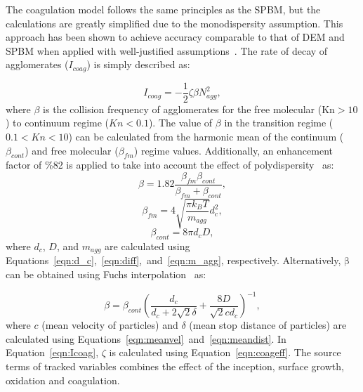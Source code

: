 The coagulation model follows the same principles as the SPBM, but the calculations are greatly simplified due to the monodispersity assumption. This approach has been shown to achieve accuracy comparable to that of DEM and SPBM when applied with well-justified assumptions~\citep{Kelesidis2017Flame, kelesidis2019estimating}. The rate of decay of agglomerates ($I_{coag}$) is simply described as:

\begin{equation}
	I_{coag} = -\frac{1}{2}\zeta\beta N^2_{agg}
	\label{eqn:Icoag},
\end{equation}
where ${\beta}$ is the collision frequency of agglomerates for the free molecular ($\mathrm{Kn>10}$) to continuum regime (${Kn<0.1}$). The value of ${\beta}$ in the transition regime (${0.1<Kn<10}$) can be calculated from the harmonic mean of the continuum (${\beta_{cont}}$) and free molecular (${\beta_{fm}}$) regime values. Additionally, an enhancement factor of \%82 is applied to take into account the effect of polydispersity~\citep{kelesidis2021self} as:
\begin{equation}
	\beta = 1.82\frac{\beta_{fm}\beta_{cont}}{\beta_{fm}+\beta_{cont}}
	\label{eqn:betahmmono},
\end{equation}
\begin{equation}
	\beta_{fm} = 4\sqrt{\frac{\pi k_B T}{m_{agg}}} d^2_c
	\label{eqn:betafmmono},
\end{equation}
\begin{equation}
	\beta_{cont} = 8\pi d_c D,
	\label{eqn:betacontmono}
\end{equation}
\noindent where $d_c$, $D$, and $m_{agg}$ are calculated using Equations~\eqref{eqn:d_c},~\eqref{eqn:diff},~and~\eqref{eqn:m_agg}, respectively.
Alternatively, $\mathrm{\beta}$ can be obtained using Fuchs interpolation~\citep{fuchs1965mechanics} as:

\begin{equation}
	\beta = \beta_{cont}
	\left(
		\frac{d_c}{d_c+2\sqrt{2}\delta} +
		\frac{8D}{\sqrt{2}c d_c}
	\right)^{-1},
	\label{eqn:betafuchsmono}
\end{equation}
\noindent where $c$ (mean velocity of particles) and $\delta$ (mean stop distance of particles) are calculated using Equations~\eqref{eqn:meanvel}~and~\eqref{eqn:meandist}. In Equation~\eqref{eqn:Icoag}, $\zeta$ is calculated using Equation~\eqref{eqn:coageff}. The source terms of tracked variables combines the effect of the inception, surface growth, oxidation and coagulation.

